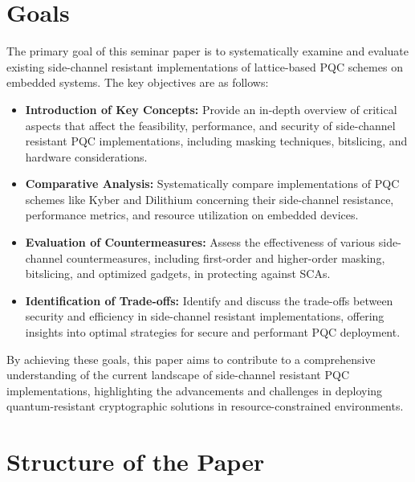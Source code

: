 \section{Goals}

The primary goal of this seminar paper is to systematically examine and evaluate existing side-channel resistant implementations of lattice-based \ac{PQC} schemes on embedded systems. The key objectives are as follows:

\begin{itemize}
    \item \textbf{Introduction of Key Concepts:} Provide an in-depth overview of critical aspects that affect the feasibility, performance, and security of side-channel resistant \ac{PQC} implementations, including masking techniques, bitslicing, and hardware considerations.
    \item \textbf{Comparative Analysis:} Systematically compare implementations of \ac{PQC} schemes like Kyber and Dilithium concerning their side-channel resistance, performance metrics, and resource utilization on embedded devices.
    \item \textbf{Evaluation of Countermeasures:} Assess the effectiveness of various side-channel countermeasures, including first-order and higher-order masking, bitslicing, and optimized gadgets, in protecting against \acp{SCA}.
    \item \textbf{Identification of Trade-offs:} Identify and discuss the trade-offs between security and efficiency in side-channel resistant implementations, offering insights into optimal strategies for secure and performant \ac{PQC} deployment.
\end{itemize}

By achieving these goals, this paper aims to contribute to a comprehensive understanding of the current landscape of side-channel resistant \ac{PQC} implementations, highlighting the advancements and challenges in deploying quantum-resistant cryptographic solutions in resource-constrained environments.

\section{Structure of the Paper}

